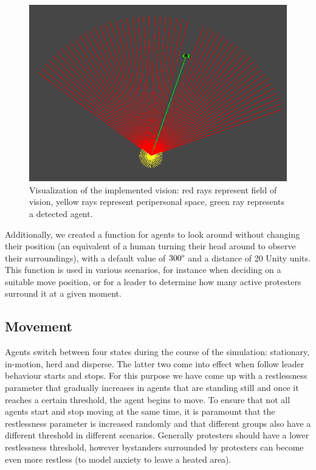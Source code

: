 \documentclass[9pt]{pnas-new}
\begin{document}
\begin{figure}[H]
\centering
\includegraphics[width=0.95\columnwidth]{vision.png}
\caption{Visualization of the implemented vision: red rays represent field of vision, yellow rays represent peripersonal space, green ray represents a detected agent.}
\label{vision}
\end{figure}

Additionally, we created a function for agents to look around without changing their position (an equivalent of a human turning their head around to observe their surroundings), with a default value of \begin{math}300\degree\end{math} and a distance of 20 Unity units. This function is used in various scenarios, for instance when deciding on a suitable move position, or for a leader to determine how many active protesters surround it at a given moment. 

\subsection*{Movement}

Agents switch between four states during the course of the simulation: stationary, in-motion, herd and disperse. The latter two come into effect when follow leader behaviour starts and stops. For this purpose we have come up with a restlessness parameter that gradually increases in agents that are standing still and once it reaches a certain threshold, the agent begins to move. To ensure that not all agents start and stop moving at the same time, it is paramount that the restlessness parameter is increased randomly and that different groups also have a different threshold in different scenarios. Generally protesters should have a lower restlessness threshold, however bystanders surrounded by protesters can become even more restless (to model anxiety to leave a heated area). 
\end{document}

